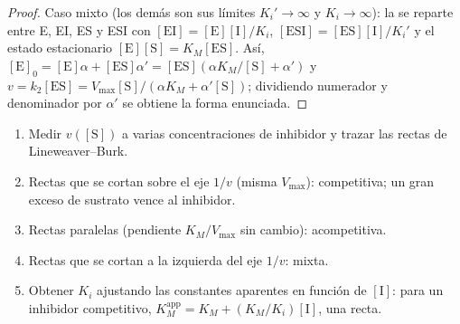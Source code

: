 \begin{proof}
Caso mixto (los demás son sus límites $K_i' \to \infty$ y $K_i \to \infty$): la  se
reparte entre E, EI, ES y ESI con $[\mathrm{EI}] = [\mathrm E][\mathrm I]/K_i$, $[\mathrm{ESI}] = [\mathrm{ES}][\mathrm I]/K_i'$
y el estado estacionario $[\mathrm E][\mathrm S] = K_M[\mathrm{ES}]$. Así, $[\mathrm E]_0 = [\mathrm E]\alpha + [\mathrm{ES}]\alpha' =
[\mathrm{ES}](\alpha K_M/[\mathrm S] + \alpha')$ y $v = k_2[\mathrm{ES}] = V_{\max}[\mathrm S]/(\alpha K_M + \alpha'[\mathrm S])$; dividiendo numerador
y denominador por $\alpha'$ se obtiene la forma enunciada.
\end{proof}

\begin{method}\label{met:b3:complex-kinetics:inhibition-type}
\begin{enumerate}
  \item Medir $v([\mathrm S])$ a varias concentraciones de inhibidor y trazar las
        rectas de Lineweaver--Burk.
  \item Rectas que se cortan sobre el eje $1/v$ (misma $V_{\max}$): competitiva; un gran exceso
        de sustrato vence al inhibidor.
  \item Rectas paralelas (pendiente $K_M/V_{\max}$ sin cambio): acompetitiva.
  \item Rectas que se cortan a la izquierda del eje $1/v$: mixta.
  \item Obtener $K_i$ ajustando las constantes aparentes en función de $[\mathrm I]$: para un
        inhibidor competitivo, $K_M^{\mathrm{app}} = K_M + (K_M/K_i)[\mathrm I]$, una recta.
\end{enumerate}
\end{method}

